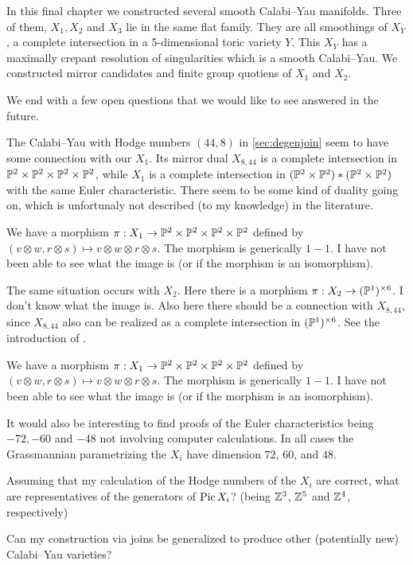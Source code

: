 In this final chapter we constructed several smooth Calabi--Yau manifolds. Three of them, $X_1,X_2$ and $X_3$ lie in the same flat family. They are all smoothings of $X_Y$, a complete intersection in a 5-dimensional toric variety $Y$. This $X_Y$ has a maximally crepant resolution of singularities which is a smooth Calabi--Yau. We constructed mirror candidates and finite group quotiens of $X_1$ and $X_2$.

We end with a few open questions that we would like to see answered in the future.


The Calabi--Yau with Hodge numbers $(44,8)$ in \cref{sec:degenjoin} seem to have some connection with our $X_1$. Its mirror dual $X_{8,44}$ is a complete intersection in $\P^2 \times \P^2 \times \P^2 \times \P^2$, while $X_1$ is a complete intersection in $(\P^2 \times \P^2) \ast (\P^2 \times \P^2)$ with the same Euler characteristic. There seem to be some kind of duality going on, which is unfortunaly not described (to my knowledge) in the literature.

We have a morphism $\pi:X_1 \to \P^2 \times \P^2 \times \P^2 \times \P^2$ defined by $(v \otimes w, r \otimes s) \mapsto v \otimes w \otimes r \otimes s$. The morphism is generically $1-1$. I have not been able to see what the image is (or if the morphism is an isomorphism).

The same situation occurs with $X_2$. Here there is a morphism ${\pi:X_2 \to (\P^1)^{\times 6}}$. I don't know what the image is. Also here there should be a connection with $X_{8,44}$, since $X_{8,44}$ also can be realized as a complete intersection in $(\P^1)^{\times 6}$. See the introduction of \cite{braun_smallhodgenumbers}.

We have a morphism $\pi:X_1 \to \P^2 \times \P^2 \times \P^2 \times \P^2$ defined by $(v \otimes w, r \otimes s) \mapsto v \otimes w \otimes r \otimes s$. The morphism is generically $1-1$. I have not been able to see what the image is (or if the morphism is an isomorphism).

It would also be interesting to find proofs of the Euler characteristics being $-72,-60$ and $-48$ not involving computer calculations. In all cases the Grassmannian parametrizing the $X_i$ have dimension $72$, $60$, and $48$. 

Assuming that my calculation of the Hodge numbers of the $X_i$ are correct, what are representatives of the generators of $\Pic X_i$? (being $\Z^3$, $\Z^5$ and $\Z^4$, respectively)

Can my construction via joins be generalized to produce other (potentially new) Calabi--Yau varieties?